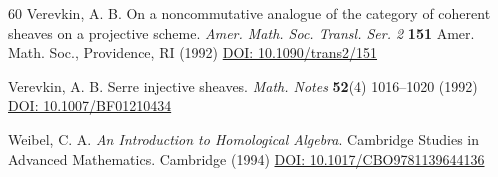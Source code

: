 \documentclass[reqno]{amsart}
\theoremstyle{definition}
\theoremstyle{remark}
\numberwithin{equation}{section}
\begin{document}
\begin{thebibliography}{60}
 Verevkin, A. B. On a noncommutative analogue of the category of coherent sheaves on a projective scheme. {\em Amer. Math. Soc. Transl. Ser. 2} {\bf 151} Amer. Math. Soc., Providence, RI (1992) \href{https://doi.org/10.1090/trans2/151}{DOI: 10.1090/trans2/151} 
 
 Verevkin, A. B. Serre injective sheaves. {\em Math. Notes} {\bf 52}(4) 1016--1020 (1992) \linebreak \href{https://doi.org/10.1007/BF01210434}{DOI: 10.1007/BF01210434}

 Weibel, C. A. {\em An Introduction to Homological Algebra}. Cambridge Studies in Advanced Mathematics. Cambridge (1994) \href{https://doi.org/10.1017/CBO9781139644136}{DOI: 10.1017/CBO9781139644136}


\end{thebibliography}
\end{document}
